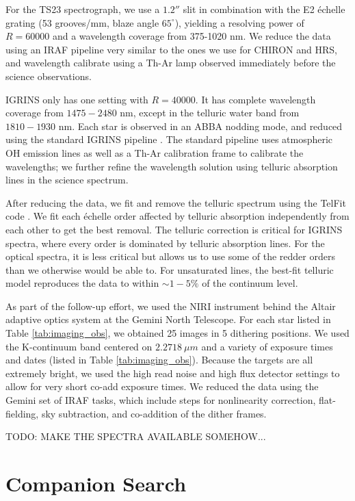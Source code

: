 \documentclass{emulateapj}
\begin{document}
For the TS23 spectrograph, we use a $1.2''$ slit in combination with the E2 \'echelle grating (53 grooves/mm, blaze angle $65^{\circ}$), yielding a resolving power of $R=60000$ and a wavelength coverage from 375-1020 nm. We reduce the data using an IRAF pipeline very similar to the ones we use for CHIRON and HRS, and wavelength calibrate using a Th-Ar lamp observed immediately before the science observations.

IGRINS only has one setting with $R = 40000$. It has complete wavelength coverage from $1475-2480$ nm, except in the telluric water band from $1810 - 1930$ nm. Each star is observed in an ABBA nodding mode, and reduced using the standard IGRINS pipeline \citep{IGRINS_plp_v2}. The standard pipeline uses atmospheric OH emission lines as well as a Th-Ar calibration frame to calibrate the wavelengths; we further refine the wavelength solution using telluric absorption lines in the science spectrum.

After reducing the data, we fit and remove the telluric spectrum using the TelFit code \citep{Gullikson2014}. We fit each \'echelle order affected by telluric absorption independently from each other to get the best removal. The telluric correction is critical for IGRINS spectra, where every order is dominated by telluric absorption lines. For the optical spectra, it is less critical but allows us to use some of the redder orders than we otherwise would be able to. For unsaturated lines, the best-fit telluric model reproduces the data to within $\sim 1-5\%$ of the continuum level.

As part of the follow-up effort, we used the NIRI instrument behind the Altair adaptive optics system at the Gemini North Telescope. For each star listed in Table \ref{tab:imaging_obs}, we obtained 25 images in 5 dithering positions. We used the K-continuum band centered on $2.2718\ \mu m$ and a variety of exposure times and dates (listed in Table \ref{tab:imaging_obs}). Because the targets are all extremely bright, we used the high read noise and high flux detector settings to allow for very short co-add exposure times. We reduced the data using the Gemini set of IRAF tasks, which include steps for nonlinearity correction, flat-fielding, sky subtraction, and co-addition of the dither frames.


TODO: MAKE THE SPECTRA AVAILABLE SOMEHOW...



\section{Companion Search}
\label{sec:companions}
\end{document}
